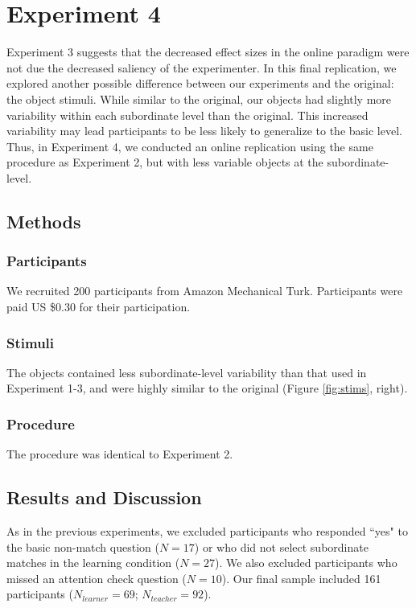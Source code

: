 \documentclass[man]{apa2}
\begin{document}
\section{Experiment 4}
Experiment 3 suggests that the decreased effect sizes in the online paradigm were not due the decreased saliency of the experimenter. In this final replication, we explored another possible difference between our experiments and the original: the object stimuli. While similar to the original, our objects had slightly more variability within each subordinate level  than the original. This increased variability may lead participants to be less likely to generalize to the basic level. Thus, in Experiment 4, we conducted an online replication using the same procedure as Experiment 2, but with less variable objects at the subordinate-level. 

\subsection{Methods}

\subsubsection{Participants}   We recruited 200 participants from Amazon Mechanical Turk. Participants were paid US \$0.30 for their participation.

\subsubsection{Stimuli}
The objects contained less subordinate-level variability than that used in Experiment 1-3, and were highly similar to the original (Figure \ref{fig:stims}, right).

\subsubsection{Procedure}
The procedure was identical to Experiment 2.

\subsection{Results and Discussion}

As in the previous experiments, we excluded participants who responded ``yes" to the basic non-match question ($N=17$) or who did not select subordinate matches in the learning condition ($N = 27$). We also excluded participants who missed an attention check question ($N = 10$). Our final sample included 161 participants ($N_{learner} = 69$; $N_{teacher} = 92$).
\end{document}
